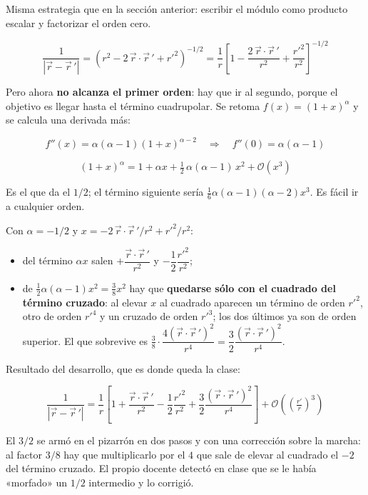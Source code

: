 \documentclass[12pt,a4paper]{article}
\begin{document}
Misma estrategia que en la sección anterior: escribir el módulo como producto
escalar y factorizar el orden cero.

\[
\frac{1}{|\vec r - \vec r\,'|}
= \left(r^2 - 2\,\vec r\cdot\vec r\,' + r'^2\right)^{-1/2}
= \frac{1}{r}\left[1 - \frac{2\,\vec r\cdot\vec r\,'}{r^2} + \frac{r'^2}{r^2}\right]^{-1/2}
\]

Pero ahora \textbf{no alcanza el primer orden}: hay que ir al segundo, porque el
objetivo es llegar hasta el término cuadrupolar. Se retoma $f(x)=(1+x)^\alpha$ y
se calcula una derivada más:

\[
f''(x) = \alpha(\alpha-1)(1+x)^{\alpha-2}
\quad\Longrightarrow\quad
f''(0) = \alpha(\alpha-1)
\]

\[
(1+x)^{\alpha} = 1 + \alpha x + \tfrac{1}{2}\,\alpha(\alpha-1)\,x^2 + \mathcal{O}(x^3)
\]

\begin{notebox}[El factor $1/n!$]
Es el que da el $1/2$; el término siguiente sería
$\tfrac{1}{6}\alpha(\alpha-1)(\alpha-2)x^3$. Es fácil ir a cualquier orden.
\end{notebox}

Con $\alpha = -1/2$ y $x = -2\,\vec r\cdot\vec r\,'/r^2 + r'^2/r^2$:

\begin{itemize}[leftmargin=*]
  \item del término $\alpha x$ salen
        $+\dfrac{\vec r\cdot\vec r\,'}{r^2}$ y
        $-\dfrac{1}{2}\dfrac{r'^2}{r^2}$;
  \item de $\tfrac12\alpha(\alpha-1)x^2 = \tfrac{3}{8}x^2$ hay que
        \textbf{quedarse sólo con el cuadrado del término cruzado}: al elevar $x$
        al cuadrado aparecen un término de orden $r'^2$, otro de orden $r'^4$ y
        un cruzado de orden $r'^3$; los dos últimos ya son de orden superior. El
        que sobrevive es
        $\tfrac{3}{8}\cdot\dfrac{4(\vec r\cdot\vec r\,')^2}{r^4}
         = \dfrac{3}{2}\dfrac{(\vec r\cdot\vec r\,')^2}{r^4}$.
\end{itemize}

Resultado del desarrollo, que es donde queda la clase:

\[
\boxed{\;\frac{1}{|\vec r - \vec r\,'|}
= \frac{1}{r}\left[1 + \frac{\vec r\cdot\vec r\,'}{r^{2}}
                     - \frac{1}{2}\frac{r'^{2}}{r^{2}}
                     + \frac{3}{2}\frac{(\vec r\cdot\vec r\,')^{2}}{r^{4}}\right]
  + \mathcal{O}\!\left(\left(\tfrac{r'}{r}\right)^{3}\right)\;}
\]

\begin{notebox}
El $3/2$ se armó en el pizarrón en dos pasos y con una corrección sobre la
marcha: al factor $3/8$ hay que multiplicarlo por el $4$ que sale de elevar al
cuadrado el $-2$ del término cruzado. El propio docente detectó en clase que se le
había «morfado» un $1/2$ intermedio y lo corrigió.
\end{notebox}
\end{document}
